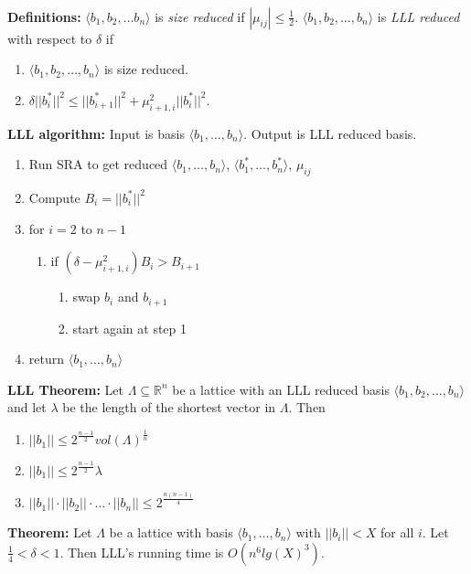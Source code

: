\\
{\bf Definitions: }  $\langle b_1, b_2, \ldots b_n \rangle$ is \emph{size reduced} if $|\mu_{ij}| \leq {\frac 1 2}$.
$\langle b_1 , b_2 , \ldots , b_n \rangle$ is \emph{LLL reduced}
with respect to $\delta$ if
\begin{enumerate}
\item  $\langle b_1 , b_2 , \ldots , b_n \rangle$ is size reduced.
\item $\delta ||b_i^*||^2 \leq ||b_{i+1}^*||^2 + \mu_{i+1,i}^2 ||b_i^*||^2$.
\end{enumerate}
{\bf LLL algorithm:} Input is basis $\langle b_1 , \ldots , b_n \rangle$.  Output is
LLL reduced basis.
\begin{enumerate}
\item Run SRA to get reduced $\langle b_1 , \ldots , b_n \rangle$,
$\langle b_1^* , \ldots , b_n^* \rangle$, $\mu_{ij}$
\item Compute $B_i = ||b_i^*||^2$
\item for $i=2$ to $n-1$
\begin{enumerate}[label*=\arabic*.]
\item if $(\delta - \mu_{i+1,i}^2)B_i > B_{i+1}$
\begin{enumerate}[label*=\arabic*.]
\item swap $b_i$ and $b_{i+1}$
\item start again at step 1
\end{enumerate}
\end{enumerate}
\item return $\langle b_1 , \ldots , b_n \rangle$
\end{enumerate}
{\bf LLL Theorem: } Let $\Lambda \subseteq {\mathbb R}^n$ be a lattice with an LLL reduced basis
$\langle b_1 , b_2 , \ldots , b_n \rangle$ and let $\lambda$ be the length of the shortest vector in $\Lambda$.  Then
\begin{enumerate}
\item $||b_1|| \leq 2^{\frac {n-1} {2}} vol(\Lambda)^{\frac 1 n}$
\item $||b_1|| \leq 2^{\frac {n-1} 2} \lambda$
\item $||b_1|| \cdot ||b_2|| \cdot \ldots \cdot ||b_n|| \leq 2^{\frac {n(n-1)} {4}}$
\end{enumerate}
{\bf Theorem: } Let $\Lambda$ be a lattice with basis $\langle b_1 , \ldots , b_n \rangle$ with
$||b_i|| < X$ for all $i$.  Let ${\frac 1 4} < \delta < 1$.  Then LLL's running time is
$O(n^6 lg(X)^3)$.
\\
\\

